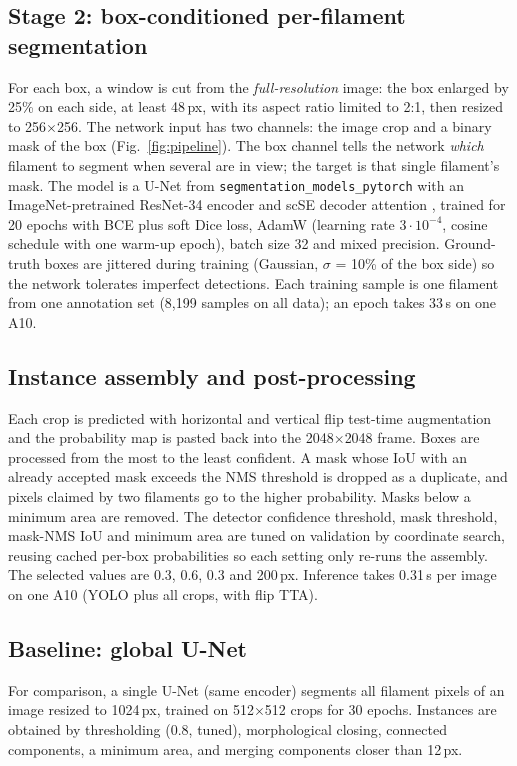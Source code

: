 \documentclass[sigconf]{acmart}
\begin{document}
\subsection{Stage 2: box-conditioned per-filament segmentation}
    For each box, a window is cut from the \emph{full-resolution} image: the box enlarged by 25\% on each side, at least 48\,px, with its aspect ratio limited to 2:1, then resized to 256$\times$256. The network input has two channels: the image crop and a binary mask of the box (Fig.~\ref{fig:pipeline}). The box channel tells the network \emph{which} filament to segment when several are in view; the target is that single filament's mask. The model is a U-Net \cite{ronneberger2015unet} from \texttt{segmentation\_models\_pytorch} \cite{iakubovskii2019smp} with an ImageNet-pretrained ResNet-34 encoder \cite{he2016resnet} and scSE decoder attention \cite{roy2018scse}, trained for 20 epochs with BCE plus soft Dice loss, AdamW \cite{loshchilov2019adamw} (learning rate $3\cdot10^{-4}$, cosine schedule with one warm-up epoch), batch size 32 and mixed precision. Ground-truth boxes are jittered during training (Gaussian, $\sigma$ = 10\% of the box side) so the network tolerates imperfect detections. Each training sample is one filament from one annotation set (8{,}199 samples on all data); an epoch takes 33\,s on one A10.

\subsection{Instance assembly and post-processing}
    Each crop is predicted with horizontal and vertical flip test-time augmentation and the probability map is pasted back into the 2048$\times$2048 frame. Boxes are processed from the most to the least confident. A mask whose IoU with an already accepted mask exceeds the NMS threshold is dropped as a duplicate, and pixels claimed by two filaments go to the higher probability. Masks below a minimum area are removed. The detector confidence threshold, mask threshold, mask-NMS IoU and minimum area are tuned on validation by coordinate search, reusing cached per-box probabilities so each setting only re-runs the assembly. The selected values are 0.3, 0.6, 0.3 and 200\,px. Inference takes 0.31\,s per image on one A10 (YOLO plus all crops, with flip TTA).

\subsection{Baseline: global U-Net}
    For comparison, a single U-Net (same encoder) segments all filament pixels of an image resized to 1024\,px, trained on 512$\times$512 crops for 30 epochs. Instances are obtained by thresholding (0.8, tuned), morphological closing, connected components, a minimum area, and merging components closer than 12\,px.
\end{document}
